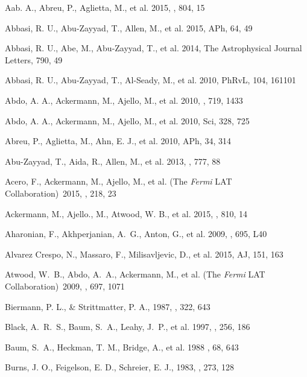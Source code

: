 \documentclass{aastex6}
\begin{document}
\begin{thebibliography}{99}

 Aab. A., Abreu, P., Aglietta, M., et al. 2015, \apj, 804, 15

 Abbasi, R. U., Abu-Zayyad, T., Allen, M., et al. 2015, APh, 64, 49

 Abbasi, R. U., Abe, M., Abu-Zayyad, T., et al. 2014, The Astrophysical Journal Letters, 790, 49

 Abbasi, R. U., Abu-Zayyad, T., Al-Seady, M., et al. 2010, PhRvL, 104, 161101

 Abdo, A. A., Ackermann, M., Ajello, M., et al. 2010, \apj, 719, 1433

 Abdo, A. A., Ackermann, M., Ajello, M., et al. 2010, Sci, 328, 725

 Abreu, P., Aglietta, M., Ahn, E. J., et al. 2010, APh, 34, 314

 Abu-Zayyad, T., Aida, R., Allen, M., et al. 2013, \apj, 777, 88

 Acero, F., Ackermann, M., Ajello, M., et al. (The \emph{Fermi} LAT Collaboration)\ 2015, \apj, 218, 23 

 Ackermann, M., Ajello., M., Atwood, W. B., et al. 2015, \apj, 810, 14

 Aharonian, F., Akhperjanian, A.~G., Anton, G., et al. 2009, \apj, 695, L40

 Alvarez Crespo, N., Massaro, F., Milisavljevic, D., et al. 2015, AJ, 151, 163

 Atwood, W.~B., Abdo, A.~A., Ackermann, M., et al. (The \emph{Fermi} LAT Collaboration)\ 2009, \apj, 697, 1071

 Biermann, P. L., \& Strittmatter, P. A., 1987, \apj, 322, 643

 Black, A.~R.~S., Baum, S.~A., Leahy, J.~P., et al. 1997, \mnras, 256, 186 

 Baum, S.~A., Heckman, T. M., Bridge, A., et al. 1988 \apjs, 68, 643

 Burns, J. O., Feigelson, E. D., Schreier, E. J., 1983, \apj, 273, 128


\end{thebibliography}
\end{document}
